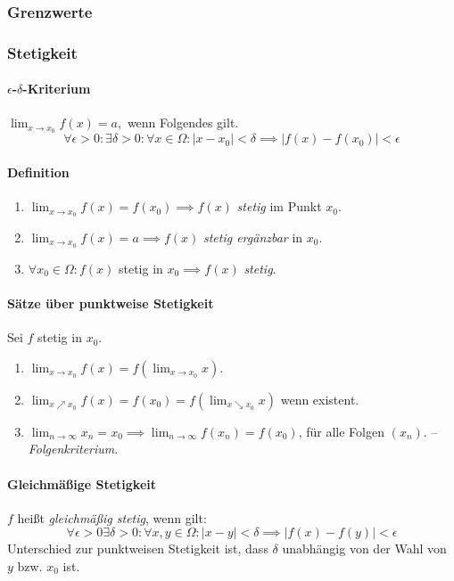 \documentclass[a4paper, 9pt, DIV=24]{scrartcl}
\begin{document}
\subsubsection{Grenzwerte}

\subsubsection{Stetigkeit}
\paragraph{$\epsilon$-$\delta$-Kriterium} $\lim_{x\rightarrow x_0} f(x) = a, $ wenn Folgendes gilt.
\[\forall\epsilon>0:\exists\delta>0: \forall x \in \Omega: |x-x_0| < \delta \implies |f(x) - f(x_0)| < \epsilon \]
\paragraph{Definition}
\begin{enumerate}[label={(}\arabic*{)}]
 \item $\lim_{x\rightarrow x_0} f(x) = f(x_0) \implies f(x)$ \emph{stetig} im Punkt $x_0$.
 \item $\lim_{x\rightarrow x_0} f(x) = a \implies f(x)$ \emph{stetig ergänzbar} in $x_0$.
 \item $\forall x_0\in\Omega: f(x) $ stetig in $x_0 \implies f(x)$ \emph{stetig}.
\end{enumerate}

\paragraph{Sätze über punktweise Stetigkeit}
Sei $f$ stetig in $x_0$.
\begin{enumerate}[label={(}\arabic*{)}]
 \item $\lim_{x\rightarrow x_0} f(x) = f(\lim_{x\rightarrow x_0} x)$.
 \item $\lim_{x\nearrow x_0} f(x) = f(x_0) = f(\lim_{x\searrow x_0} x)$ wenn existent.
 \item $\lim_{n\rightarrow \infty} x_n = x_0 \implies \lim_{n\rightarrow \infty} f(x_n) = f(x_0)$, für alle Folgen $(x_n)$. -- \emph{Folgenkriterium}.
\end{enumerate}

\paragraph{Gleichmäßige Stetigkeit}
$f$ heißt \emph{gleichmäßig stetig}, wenn gilt:
\[\forall\epsilon>0\exists\delta>0: \forall x,y \in \Omega: |x-y| < \delta \implies |f(x) - f(y)| < \epsilon \]
Unterschied zur punktweisen Stetigkeit ist, dass $\delta$ unabhängig von der Wahl von $y$ bzw. $x_0$ ist.
\end{document}
